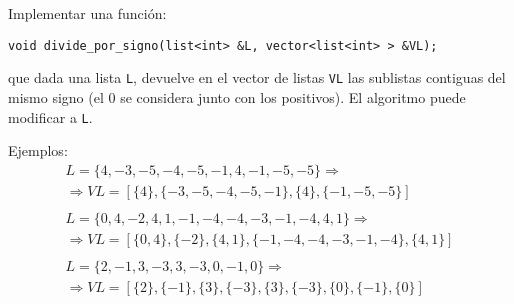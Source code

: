 \documentclass[12pt]{article}
\begin{document}
    \begin{ejercicio}[1 punto]
        Implementar una función:
        \begin{verbatim}
void divide_por_signo(list<int> &L, vector<list<int> > &VL);
        \end{verbatim}
        que dada una lista \verb|L|, devuelve en el vector de listas \verb|VL| las sublistas contiguas del mismo signo (el 0 se considera junto con los positivos). El algoritmo puede modificar a \verb|L|.

        Ejemplos:
        \begin{gather*}
            L=\{4,-3,-5,-4,-5,-1,4,-1,-5,-5\} \Rightarrow \\ 
            \Rightarrow VL=[\{4\}, \{-3,-5,-4,-5,-1\}, \{4\}, \{-1,-5,-5\}] \\ \\
            L=\{0,4,-2,4,1,-1,-4,-4,-3,-1,-4,4,1\} \Rightarrow \\ 
            \Rightarrow VL=[\{0,4\},\{-2\},\{4,1\},\{-1,-4,-4,-3,-1,-4\},\{4,1\}] \\ \\
            L=\{2,-1,3,-3,3,-3,0,-1,0\} \Rightarrow \\ 
            \Rightarrow VL=[\{2\},\{-1\},\{3\},\{-3\},\{3\},\{-3\},\{0\},\{-1\},\{0\}] \\
        \end{gather*}
        
    \end{ejercicio}
\end{document}
